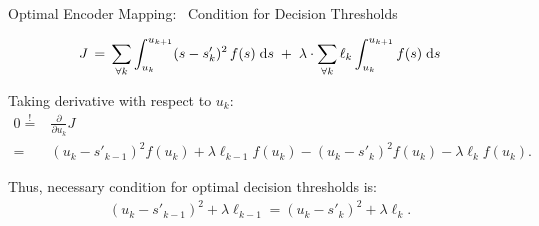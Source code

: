 

\begin{frame}{Optimal Encoder Mapping:~ Condition for Decision Thresholds}


  \vspace{-1.0ex}
  $$
  J\,=\,\sum_{\forall k}\int_{u_k}^{u_{k+1}}(s-s'_k)^2\,f(s)\;\mathrm{d} s
  \;+\;\lambda\cdot\sum_{\forall k}\ell_k\int_{u_k}^{u_{k+1}}f(s)\;\mathrm{d} s
  $$
  \medskip

\bit
\item
Taking derivative with respect to $u_k$: 
\begin{align*}
0\stackrel{!}{=}&\frac{\partial}{\partial u_k}J\\
=&(u_k-s'_{k-1})^2f(u_k)+\lambda\ell_{k-1}f(u_k)-(u_k-s'_k)^2f(u_k)-\lambda\ell_{k}f(u_k).
\end{align*}
\item[\iarrow]Thus, necessary condition for optimal decision thresholds is:
\begin{align*}
(u_k-s'_{k-1})^2+\lambda\ell_{k-1}=(u_k-s'_k)^2+\lambda\ell_{k}.
\end{align*}

\eit


\end{frame}
